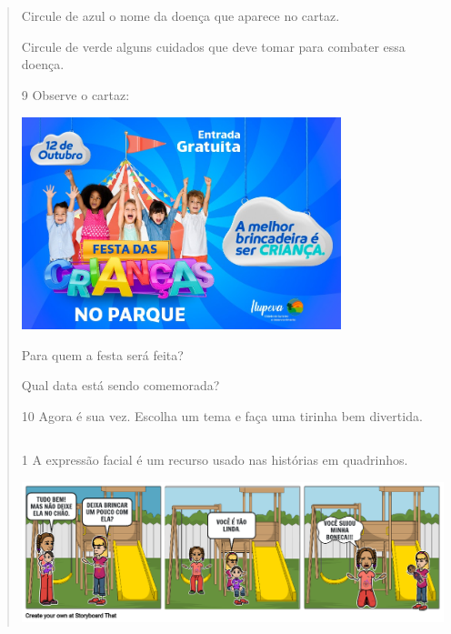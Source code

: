 \begin{verse}

\begin{escolha}
\item Circule de azul o nome da doença que aparece no cartaz.

\item Circule de verde alguns cuidados que deve tomar para combater essa doença.
\end{escolha}

\num{9} Observe o cartaz:

\includegraphics[width=3.66026in,height=2.43572in]{media/image135.jpeg}


\begin{escolha}
\item Para quem a festa será feita?


\item Qual data está sendo comemorada?

\end{escolha}

\num{10} Agora é sua vez. Escolha um tema e faça uma tirinha bem divertida.

\begin{longtable}[]{@{}ll@{}}
\toprule
&\tabularnewline
\bottomrule
\end{longtable}


\num{1} A expressão facial é um recurso usado nas histórias em quadrinhos.

\includegraphics[width=4.88436in,height=1.61667in]{media/image136.png}


\end{verse}
